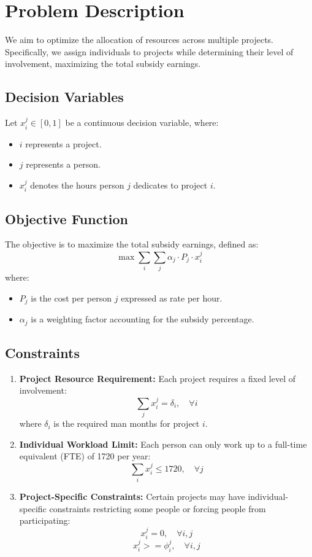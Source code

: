 \documentclass{article}
\begin{document}
	
	\section*{Problem Description}
	
	We aim to optimize the allocation of resources across multiple projects. Specifically, we assign individuals to projects while determining their level of involvement, maximizing the total subsidy earnings.

	
	\subsection*{Decision Variables}
	Let \( x_i^j \in [0,1] \) be a continuous decision variable, where:
	\begin{itemize}
		\item \( i \) represents a project.
		\item \( j \) represents a person.
		\item \( x_i^j \) denotes the hours person \( j \) dedicates to project \( i \).
	\end{itemize}
	
	\subsection*{Objective Function}
	The objective is to maximize the total subsidy earnings, defined as:
	\[
	\max \sum_{i} \sum_{j} \alpha_j  \cdot P_j\cdot x_i^j
	\]
	where:
	\begin{itemize}
		\item \( P_j \) is the cost per person $j$ expressed as rate per hour.
		\item \( \alpha_j \) is a weighting factor accounting for the subsidy percentage.
	\end{itemize}
	
	\subsection*{Constraints}
	\begin{enumerate}
		\item \textbf{Project Resource Requirement:  }
		Each project requires a fixed level of involvement:
		\[
		\sum_j x_i^j  = \delta_i, \quad \forall i
		\]
		where \( \delta_i \) is the required man months for project \( i \).
	
	    \item \textbf{Individual Workload Limit:  }
		Each person can only work up to a full-time equivalent (FTE) of 1720 per year:
		\[
		\sum_i x_i^j \leq 1720, \quad \forall j
		\]
		
		\item \textbf{Project-Specific Constraints:  }
		Certain projects may have individual-specific constraints restricting some people or forcing people from participating:
		\[
		x_i^j = 0, \quad \forall i, j
		\]
		\[
		x_i^j >= \phi_i^j, \quad \forall i, j
		\]
		
\end{enumerate}
\end{document}
